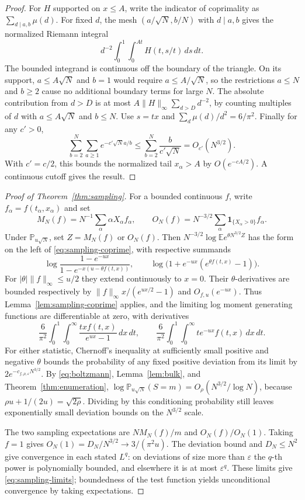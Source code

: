 \documentclass[11pt]{amsart}
\theoremstyle{remark}
\begin{document}
\begin{proof}
For \(H\) supported on \(x\le A\), write the indicator of coprimality
as \(\sum_{d\mid a,b}\mu(d)\). For fixed \(d\), the mesh
\((a/\sqrt N,b/N)\) with \(d\mid a,b\) gives the normalized Riemann
integral
\[
 d^{-2}\int_0^1\int_0^{At} H(t,s/t)\,ds\,dt .
\]
The bounded integrand is continuous off the boundary of the triangle.
On its support, \(a\le A\sqrt N\) and \(b=1\) would require
\(a\le A/\sqrt N\), so the restrictions \(a\le N\) and \(b\ge2\) cause
no additional boundary terms for large \(N\). The absolute contribution
from \(d>D\) is at most \(A\|H\|_\infty\sum_{d>D}d^{-2}\), by counting
multiples of \(d\) with \(a\le A\sqrt N\) and \(b\le N\). Use \(s=tx\)
and \(\sum_d\mu(d)/d^2=6/\pi^2\). Finally for any \(c'>0\),
\[
 \sum_{b=2}^N\sum_{a\ge1}e^{-c'\sqrt N a/b}
 \le\sum_{b=2}^N\frac{b}{c'\sqrt N}=O_{c'}(N^{3/2}).
\]
With \(c'=c/2\), this bounds the normalized tail \(x_\alpha>A\) by
\(O(e^{-cA/2})\). A continuous cutoff gives the result.
\end{proof}

\begin{proof}[Proof of Theorem~\ref{thm:sampling}]
For a bounded continuous \(f\), write \(f_\alpha=f(t_\alpha,x_\alpha)\)
and set
\[
 M_N(f)=N^{-1}\sum_\alpha\alpha X_\alpha f_\alpha,\qquad
 O_N(f)=N^{-3/2}\sum_\alpha\mathbf 1_{\{X_\alpha>0\}}f_\alpha .
\]
Under \(\mathbb P_{u\sqrt N}\), set \(Z=M_N(f)\) or \(O_N(f)\).
Then \(N^{-3/2}\log\mathbb E e^{\theta N^{3/2}Z}\) has the form on the
left of \eqref{eq:sampling-coprime}, with respective summands
\[
 \log\frac{1-e^{-ux}}{1-e^{-x(u-\theta f(t,x))}},\qquad
 \log\bigl(1+e^{-ux}(e^{\theta f(t,x)}-1)\bigr).
\]
For \(|\theta|\|f\|_\infty\le u/2\) they extend continuously to \(x=0\).
Their \(\theta\)-derivatives are bounded respectively by
\(\|f\|_\infty x/(e^{ux/2}-1)\) and \(O_{f,u}(e^{-ux})\).
Thus Lemma~\ref{lem:sampling-coprime} applies, and the limiting log
moment generating functions are differentiable at zero, with derivatives
\[
 \frac{6}{\pi^2}\int_0^1\int_0^\infty
   \frac{tx f(t,x)}{e^{ux}-1}\,dx\,dt,\qquad
 \frac{6}{\pi^2}\int_0^1\int_0^\infty t e^{-ux}f(t,x)\,dx\,dt .
\]
For either statistic, Chernoff's inequality at sufficiently small positive
and negative \(\theta\) bounds the probability of any fixed positive
deviation from its limit by \(2e^{-c_{f,\rho,\varepsilon}N^{3/2}}\).
By \eqref{eq:boltzmann}, Lemma~\ref{lem:bulk}, and
Theorem~\ref{thm:enumeration},
\(\log\mathbb P_{u\sqrt N}(S=m)=O_\rho(N^{3/2}/\log N)\), because
\(\rho u+1/(2u)=\sqrt{2\rho}\). Dividing by this conditioning probability
still leaves exponentially small deviation bounds on the \(N^{3/2}\) scale.

The two sampling expectations are \(NM_N(f)/m\) and \(O_N(f)/O_N(1)\).
Taking \(f=1\) gives \(O_N(1)=D_N/N^{3/2}\to3/(\pi^2u)\). The
deviation bound and \(D_N\le N^2\) give convergence in each stated \(L^q\):
on deviations of size more than \(\varepsilon\) the \(q\)-th power is
polynomially bounded, and elsewhere it is at most \(\varepsilon^q\).
These limits give \eqref{eq:sampling-limits}; boundedness of the test
function yields unconditional convergence by taking expectations.
\end{proof}
\end{document}

